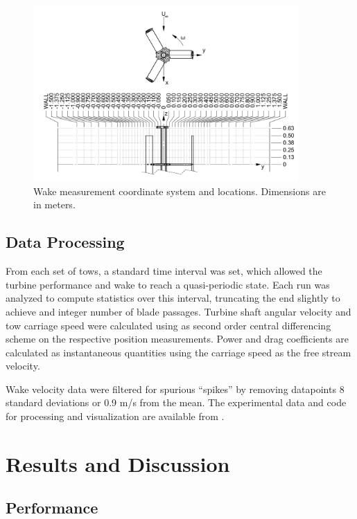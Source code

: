 \documentclass[energies,article,accept,moreauthors,pdftex,12pt,a4paper]{mdpi}
\begin{document}
\begin{figure}
\centering

\includegraphics[width=0.9\textwidth]{figures/turbine_coordinate_system}

\caption{Wake measurement coordinate system and locations. Dimensions are in
    meters.}

\label{fig:wake-locations}
\end{figure}


\subsection{Data Processing}

From each set of tows, a standard time interval was set, which allowed the
turbine performance and wake to reach a quasi-periodic state. Each run was
analyzed to compute statistics over this interval, truncating the end slightly
to achieve and integer number of blade passages. Turbine shaft angular velocity
and tow carriage speed were calculated using as second order central
differencing scheme on the respective position measurements. Power and drag
coefficients are calculated as instantaneous quantities using the carriage speed
as the free stream velocity.

Wake velocity data were filtered for spurious ``spikes'' by removing datapoints
8 standard deviations or 0.9 m/s from the mean. The experimental data and code
for processing and visualization are available from
\cite{Bachant2015-RVAT-Re-dep-data}.


\section{Results and Discussion}


\subsection{Performance}
\end{document}
